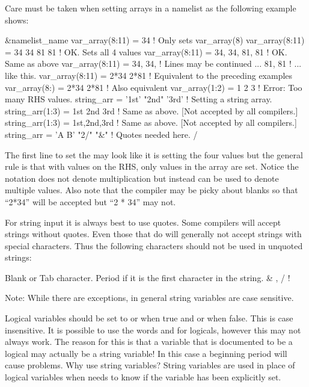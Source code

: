 Care must be taken when setting arrays in a namelist as the following example
shows:
\begin{example}
  &namelist_name
    var_array(8:11) = 34             ! Only sets var_array(8)
    var_array(8:11) = 34 34 81 81    ! OK. Sets all 4 values
    var_array(8:11) = 34, 34, 81, 81 ! OK. Same as above
    var_array(8:11) = 34, 34,        ! Lines may be continued ...
                      81, 81         !   ... like this.
    var_array(8:11) = 2*34 2*81      ! Equivalent to the preceding examples
    var_array(8:)   = 2*34 2*81      ! Also equivalent
    var_array(1:2) = 1 2 3           ! Error: Too many RHS values.
    string_arr = '1st' "2nd" '3rd'   ! Setting a string array.
    string_arr(1:3) = 1st 2nd 3rd    ! Same as above. [Not accepted by all compilers.]
    string_arr(1:3) = 1st,2nd,3rd    ! Same as above. [Not accepted by all compilers.]
    string_arr = 'A B' "2/" "&"      ! Quotes needed here.
  /
\end{example}
The first line to set the  may look like it is setting 
the four values  but the general rule is that with 
values on the RHS, only  values in the array are set. Notice the notation
 does not denote multiplication but instead can be used to denote
multiple values. Also note that the compiler may be picky about blanks so 
that ``2*34'' will be accepted but ``2 * 34'' may not.

For string input it is always best to use quotes. Some compilers will
accept strings without quotes. Even those that do will generally not
accept strings with special characters.  Thus the following characters
should not be used in unquoted strings:
\begin{example}
  Blank or Tab character.
  Period if it is the first character in the string.
  &   ,   /    !   %
\end{example}
Note: While there are exceptions, in general \tao string variables are
case sensitive.

Logical variables should be set to  or  when true and  or  when
false. This is case insensitive. It is possible to use the words  and  for
logicals, however this may not always work. The reason for this is that a variable that is
documented to be a logical may actually be a string variable! In this case a beginning period will
cause problems. Why use string variables? String variables are used in place of logical variables
when \tao needs to know if the variable has been explicitly set.

